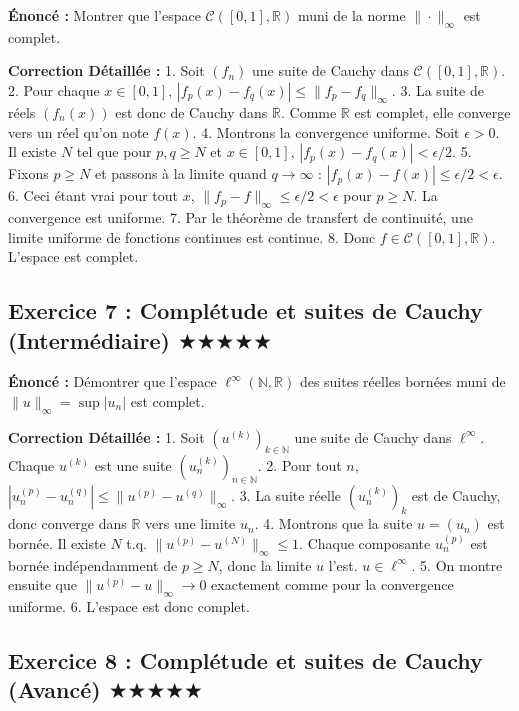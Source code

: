 \documentclass[11pt,a4paper]{article}
\begin{document}
\textbf{Énoncé :}
Montrer que l'espace $\mathcal{C}([0,1], \mathbb{R})$ muni de la norme $\|\cdot\|_\infty$ est complet.

\textbf{Correction Détaillée :}
1. Soit $(f_n)$ une suite de Cauchy dans $\mathcal{C}([0,1], \mathbb{R})$.
2. Pour chaque $x \in [0,1]$, $|f_p(x) - f_q(x)| \leq \|f_p - f_q\|_\infty$.
3. La suite de réels $(f_n(x))$ est donc de Cauchy dans $\mathbb{R}$. Comme $\mathbb{R}$ est complet, elle converge vers un réel qu'on note $f(x)$.
4. Montrons la convergence uniforme. Soit $\epsilon > 0$. Il existe $N$ tel que pour $p, q \ge N$ et $x \in [0,1]$, $|f_p(x) - f_q(x)| < \epsilon/2$.
5. Fixons $p \ge N$ et passons à la limite quand $q \to \infty$ : $|f_p(x) - f(x)| \leq \epsilon/2 < \epsilon$.
6. Ceci étant vrai pour tout $x$, $\|f_p - f\|_\infty \leq \epsilon/2 < \epsilon$ pour $p \ge N$. La convergence est uniforme.
7. Par le théorème de transfert de continuité, une limite uniforme de fonctions continues est continue.
8. Donc $f \in \mathcal{C}([0,1], \mathbb{R})$. L'espace est complet.


\subsection*{Exercice 7 : Complétude et suites de Cauchy (Intermédiaire) \quad $\bigstar\bigstar\bigstar\bigstar\bigstar$}

\textbf{Énoncé :}
Démontrer que l'espace $\ell^\infty(\mathbb{N}, \mathbb{R})$ des suites réelles bornées muni de $\|u\|_\infty = \sup |u_n|$ est complet.

\textbf{Correction Détaillée :}
1. Soit $(u^{(k)})_{k \in \mathbb{N}}$ une suite de Cauchy dans $\ell^\infty$. Chaque $u^{(k)}$ est une suite $(u_n^{(k)})_{n \in \mathbb{N}}$.
2. Pour tout $n$, $|u_n^{(p)} - u_n^{(q)}| \leq \|u^{(p)} - u^{(q)}\|_\infty$.
3. La suite réelle $(u_n^{(k)})_{k}$ est de Cauchy, donc converge dans $\mathbb{R}$ vers une limite $u_n$.
4. Montrons que la suite $u = (u_n)$ est bornée. Il existe $N$ t.q. $\|u^{(p)} - u^{(N)}\|_\infty \le 1$. Chaque composante $u_n^{(p)}$ est bornée indépendamment de $p \ge N$, donc la limite $u$ l'est. $u \in \ell^\infty$.
5. On montre ensuite que $\|u^{(p)} - u\|_\infty \to 0$ exactement comme pour la convergence uniforme.
6. L'espace est donc complet.


\subsection*{Exercice 8 : Complétude et suites de Cauchy (Avancé) \quad $\bigstar\bigstar\bigstar\bigstar\bigstar$}
\end{document}
